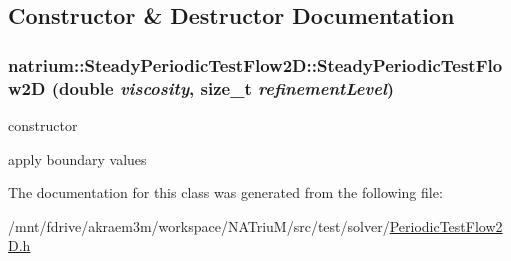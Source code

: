 \subsection{Constructor \& Destructor Documentation}
\hypertarget{classnatrium_1_1SteadyPeriodicTestFlow2D_a7db4598e86b34158612497ea2ff0ca74}{
\subsubsection[{SteadyPeriodicTestFlow2D}]{\setlength{\rightskip}{0pt plus 5cm}natrium::SteadyPeriodicTestFlow2D::SteadyPeriodicTestFlow2D (double {\em viscosity}, \/  size\_\-t {\em refinementLevel})}}
\label{classnatrium_1_1SteadyPeriodicTestFlow2D_a7db4598e86b34158612497ea2ff0ca74}


constructor 

apply boundary values 

The documentation for this class was generated from the following file:\begin{DoxyCompactItemize}
\item 
/mnt/fdrive/akraem3m/workspace/NATriuM/src/test/solver/\hyperlink{PeriodicTestFlow2D_8h}{PeriodicTestFlow2D.h}\end{DoxyCompactItemize}
